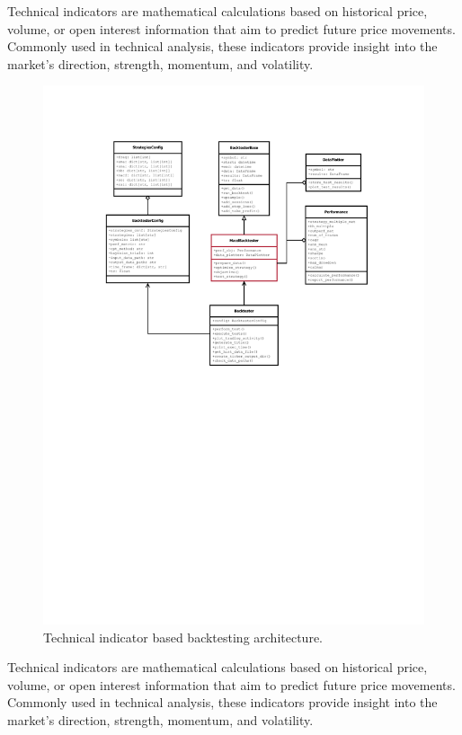 Technical indicators are mathematical calculations based on historical price, volume, or open interest information that aim to predict future price movements.
Commonly used in technical analysis, these indicators provide insight into the market's direction, strength, momentum, and volatility.
\noindent

\begin{figure}[ht!]
\centering
\includegraphics[page=1, trim=30mm 135mm 0 25mm, width=1.1\textwidth, clip]{./pdf/backtester_uml.pdf}
\caption{Technical indicator based backtesting architecture.}
\label{fig:tech_indicator_arch}
\end{figure}

\noindent
Technical indicators are mathematical calculations based on historical price, volume, or open interest information that aim to predict future price movements.
Commonly used in technical analysis, these indicators provide insight into the market's direction, strength, momentum, and volatility.

